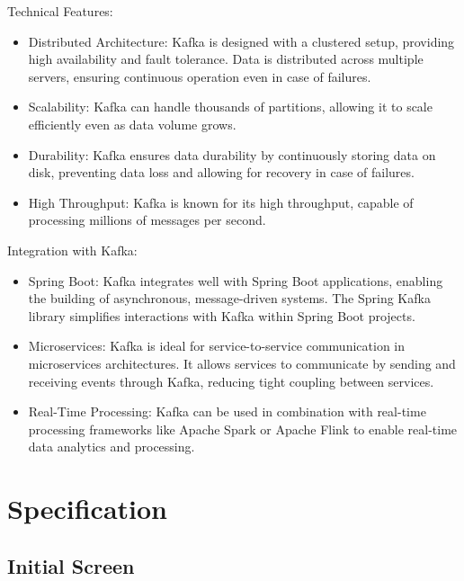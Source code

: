 \documentclass[conference]{IEEEtran}
\begin{document}
Technical Features:
\begin{itemize}
    \item Distributed Architecture: Kafka is designed with a clustered setup, providing high availability and fault tolerance. Data is distributed across multiple servers, ensuring continuous operation even in case of failures.\\
    \item Scalability: Kafka can handle thousands of partitions, allowing it to scale efficiently even as data volume grows.\\
    \item Durability: Kafka ensures data durability by continuously storing data on disk, preventing data loss and allowing for recovery in case of failures.\\
    \item High Throughput: Kafka is known for its high throughput, capable of processing millions of messages per second.\\
\end{itemize}

Integration with Kafka:
\begin{itemize}
    \item Spring Boot: Kafka integrates well with Spring Boot applications, enabling the building of asynchronous, message-driven systems. The Spring Kafka library simplifies interactions with Kafka within Spring Boot projects.\\
    \item Microservices: Kafka is ideal for service-to-service communication in microservices architectures. It allows services to communicate by sending and receiving events through Kafka, reducing tight coupling between services.\\
    \item Real-Time Processing: Kafka can be used in combination with real-time processing frameworks like Apache Spark or Apache Flink to enable real-time data analytics and processing.\\
\end{itemize}

\clearpage

\section{Specification}

\subsection{Initial Screen}
\end{document}
